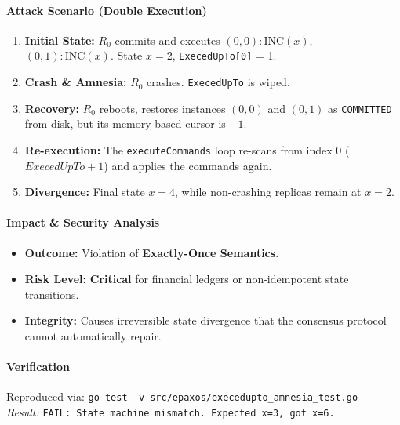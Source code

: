 \documentclass{article}
\theoremstyle{plain}
\theoremstyle{definition}
\theoremstyle{remark}
\begin{document}
{\paragraph{Attack Scenario (Double Execution)}
\begin{enumerate}
    \item \textbf{Initial State:} $R_0$ commits and executes $(0,0): \text{INC}(x)$, $(0,1): \text{INC}(x)$. State $x=2$, \texttt{ExecedUpTo[0]} = 1.
    \item \textbf{Crash \& Amnesia:} $R_0$ crashes. \texttt{ExecedUpTo} is wiped. 
    \item \textbf{Recovery:} $R_0$ reboots, restores instances $(0,0)$ and $(0,1)$ as \texttt{COMMITTED} from disk, but its memory-based cursor is $-1$.
    \item \textbf{Re-execution:} The \texttt{executeCommands} loop re-scans from index 0 ($ExecedUpTo + 1$) and applies the commands again.
    \item \textbf{Divergence:} Final state $x=4$, while non-crashing replicas remain at $x=2$.
\end{enumerate}

\paragraph{Impact \& Security Analysis}
\begin{itemize}
    \item \textbf{Outcome:} Violation of \textbf{Exactly-Once Semantics}.
    \item \textbf{Risk Level:} \textbf{Critical} for financial ledgers or non-idempotent state transitions.
    \item \textbf{Integrity:} Causes irreversible state divergence that the consensus protocol cannot automatically repair.
\end{itemize}

\paragraph{Verification}
Reproduced via: \texttt{go test -v src/epaxos/execedupto\_amnesia\_test.go} \\
\textit{Result:} \texttt{FAIL: State machine mismatch. Expected x=3, got x=6.}
}


\end{document}
